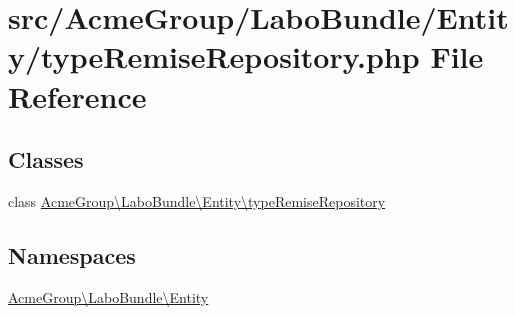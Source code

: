 \hypertarget{type_remise_repository_8php}{\section{src/\+Acme\+Group/\+Labo\+Bundle/\+Entity/type\+Remise\+Repository.php File Reference}
\label{type_remise_repository_8php}
}
\subsection*{Classes}
\begin{DoxyCompactItemize}
\item 
class \hyperlink{class_acme_group_1_1_labo_bundle_1_1_entity_1_1type_remise_repository}{Acme\+Group\textbackslash{}\+Labo\+Bundle\textbackslash{}\+Entity\textbackslash{}type\+Remise\+Repository}
\end{DoxyCompactItemize}
\subsection*{Namespaces}
\begin{DoxyCompactItemize}
\item 
 \hyperlink{namespace_acme_group_1_1_labo_bundle_1_1_entity}{Acme\+Group\textbackslash{}\+Labo\+Bundle\textbackslash{}\+Entity}
\end{DoxyCompactItemize}
